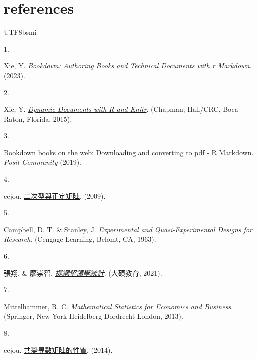 \documentclass[
]{book}
\newlength{\cslhangindent}
\newlength{\csllabelwidth}
\newenvironment{CSLReferences}[2] %
 {\begin{list}{}{%
  \setlength{\itemindent}{0pt}
  \setlength{\leftmargin}{0pt}
  \setlength{\parsep}{0pt}
  \ifodd #1
   \setlength{\leftmargin}{\cslhangindent}
   \setlength{\itemindent}{-1\cslhangindent}
  \fi
  \setlength{\itemsep}{#2\baselineskip}}}
 {\end{list}}
\newcommand{\CSLLeftMargin}[1]{\parbox[t]{\csllabelwidth}{\strut#1\strut}}
\newcommand{\CSLRightInline}[1]{\parbox[t]{\linewidth - \csllabelwidth}{\strut#1\strut}}
\theoremstyle{definition}
\theoremstyle{definition}
\theoremstyle{definition}
\theoremstyle{definition}
\theoremstyle{remark}
\begin{document}
\chapter*{references}\label{references}
\begin{CJK}{UTF8}{bsmi}
\label{refs}
\begin{CSLReferences}{0}{0}
\CSLLeftMargin{1. }%
\CSLRightInline{Xie, Y. \emph{\href{https://CRAN.R-project.org/package=bookdown}{Bookdown: Authoring Books and Technical Documents with r Markdown}}. (2023).}

\CSLLeftMargin{2. }%
\CSLRightInline{Xie, Y. \emph{\href{http://yihui.org/knitr/}{Dynamic Documents with {R} and Knitr}}. (Chapman; Hall/CRC, Boca Raton, Florida, 2015).}

\CSLLeftMargin{3. }%
\CSLRightInline{\href{https://community.rstudio.com/t/bookdown-books-on-the-web-downloading-and-converting-to-pdf/30268}{Bookdown books on the web: Downloading and converting to pdf - {R} {Markdown}}. \emph{Posit Community} (2019).}

\CSLLeftMargin{4. }%
\CSLRightInline{ccjou. \href{https://ccjou.wordpress.com/2009/10/21/\%e4\%ba\%8c\%e6\%ac\%a1\%e5\%9e\%8b\%e8\%88\%87\%e6\%ad\%a3\%e5\%ae\%9a\%e7\%9f\%a9\%e9\%99\%a3/}{二次型與正定矩陣}. (2009).}

\CSLLeftMargin{5. }%
\CSLRightInline{Campbell, D. T. \& Stanley, J. \emph{Experimental and Quasi-Experimental Designs for Research}. (Cengage Learning, Belomt, CA, 1963).}

\CSLLeftMargin{6. }%
\CSLRightInline{張翔. \& 廖崇智. \emph{\href{https://www.books.com.tw/products/0010888833}{提綱挈領學統計}}. (大碩教育, 2021).}

\CSLLeftMargin{7. }%
\CSLRightInline{Mittelhammer, R. C. \emph{Mathematical Statistics for Economics and Business}. (Springer, New York Heidelberg Dordrecht London, 2013).}

\CSLLeftMargin{8. }%
\CSLRightInline{ccjou. \href{https://ccjou.wordpress.com/2014/06/03/\%e5\%85\%b1\%e8\%ae\%8a\%e7\%95\%b0\%e6\%95\%b8\%e7\%9f\%a9\%e9\%99\%a3\%e7\%9a\%84\%e6\%80\%a7\%e8\%b3\%aa/}{共變異數矩陣的性質}. (2014).}


\end{CSLReferences}
\end{CJK}
\end{document}
